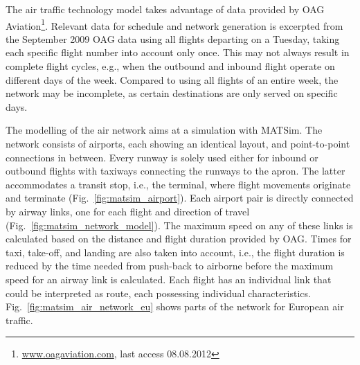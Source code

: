 The air traffic technology model takes advantage of data provided by OAG Aviation\footnote{\url{www.oagaviation.com}, last access 08.08.2012}. 
Relevant data for schedule and network generation is excerpted from the September 2009 OAG data using all flights departing on a Tuesday, taking each specific flight number into account only once.
This may not always result in complete flight cycles, e.g., when the outbound and inbound flight operate on different days of the week. 
Compared to using all flights of an entire week, the network may be incomplete, as certain destinations are only served on specific days.


The modelling of the air network aims at a simulation with MATSim. 
The network consists of airports, each showing an identical layout, and point-to-point connections in between. 
Every runway is solely used either for inbound or outbound flights with taxiways connecting the runways to the apron. The latter accommodates a transit stop, i.e., the terminal, where flight movements originate and terminate (Fig.~\ref{fig:matsim_airport}). 
Each airport pair is directly connected by airway links, one for each flight and direction of travel (Fig.~\ref{fig:matsim_network_model}). 
The maximum speed on any of these links is calculated based on the distance and flight duration provided by OAG. 
Times for taxi, take-off, and landing are also taken into account, i.e., the flight duration is reduced by the time needed from push-back to airborne before the maximum speed for an airway link is calculated.
Each flight has an individual link that could be interpreted as route, each possessing individual characteristics. 
Fig.~\ref{fig:matsim_air_network_eu} shows parts of the network for European air traffic.

